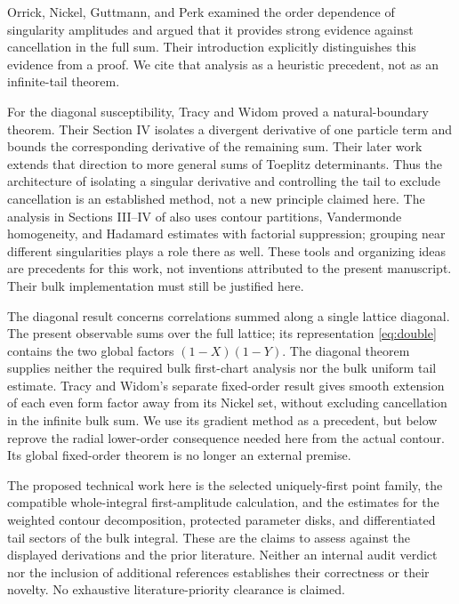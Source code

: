 \documentclass[11pt]{article}
\numberwithin{equation}{section}
\theoremstyle{definition}
\begin{document}
Orrick, Nickel, Guttmann, and Perk \cite[Section~3.2]{Orrick2001}
examined the order dependence of singularity amplitudes and argued
that it provides strong evidence against cancellation in the full sum.
Their introduction explicitly distinguishes this evidence from a proof.
We cite that analysis as a heuristic precedent, not as an infinite-tail
theorem.

For the diagonal susceptibility, Tracy and Widom \cite{TW2013}
proved a natural-boundary theorem. Their Section IV isolates a
divergent derivative of one particle term and bounds the corresponding
derivative of the remaining sum. Their later work
\cite{TW2017Toeplitz} extends that direction to more general sums
of Toeplitz determinants. Thus the architecture of isolating a
singular derivative and controlling the tail to exclude cancellation
is an established method, not a new principle claimed here.
The analysis in Sections III--IV of \cite{TW2017Toeplitz} also uses
contour partitions, Vandermonde homogeneity, and Hadamard estimates
with factorial suppression; grouping near different singularities
plays a role there as well. These tools and organizing ideas are
precedents for this work, not inventions attributed to the present
manuscript. Their bulk implementation must still be justified here.

The diagonal result concerns correlations summed along a single
lattice diagonal. The present observable sums over the full lattice;
its representation \eqref{eq:double} contains the two global factors
\((1-X)(1-Y)\). The diagonal theorem supplies neither the required
bulk first-chart analysis nor the bulk uniform tail estimate.
Tracy and Widom's separate fixed-order result \cite{TW2014}
gives smooth extension of each even form factor away from its Nickel
set, without excluding cancellation in the infinite bulk sum.
We use its gradient method as a precedent, but below reprove the radial
lower-order consequence needed here from the actual contour. Its global
fixed-order theorem is no longer an external premise.

The proposed technical work here is the selected uniquely-first point
family, the compatible whole-integral first-amplitude calculation,
and the estimates for the weighted contour decomposition, protected
parameter disks, and differentiated tail sectors of the bulk integral.
These are the claims to assess against the displayed derivations and
the prior literature. Neither an internal audit verdict nor the
inclusion of additional references establishes their correctness or
their novelty. No exhaustive literature-priority clearance is claimed.
\end{document}
